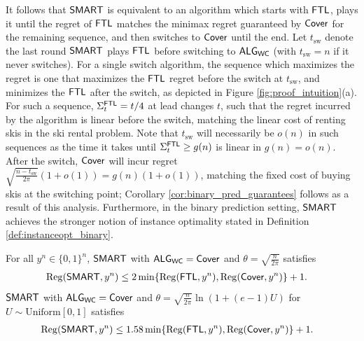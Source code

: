 It follows that $\mathsf{SMART}$ is equivalent to an algorithm which starts with $\mathsf{FTL}$, plays it until the regret of $\mathsf{FTL}$ matches the minimax regret guaranteed by $\mathsf{Cover}$ for the remaining sequence, and then switches to $\mathsf{Cover}$ until the end. 
Let $t_{\mathrm{sw}}$ denote the last round $\mathsf{SMART}$ plays $\mathsf{FTL}$ before switching to $\mathsf{ALG}_{\mathsf{WC}}$ (with $t_{\mathrm{sw}}=n$ if it never switches).
For a single switch algorithm, the sequence which maximizes the regret is one that maximizes the $\mathsf{FTL}$ regret before the switch at $t_{\mathrm{sw}}$, and minimizes the $\mathsf{FTL}$ after the switch, as depicted in Figure \ref{fig:proof_intuition}(a). For such a sequence, $\Sigma^{\mathsf{FTL}}_t = t/4$ at lead changes $t$, such that the regret incurred by the algorithm is linear before the switch, matching the linear cost of renting skis in the ski rental problem. Note that $t_{\mathrm{sw}}$ will necessarily be $o(n)$ in such sequences as the time it takes until $\Sigma^{\mathsf{FTL}}_t \geq g(n)$ is linear in $g(n) = o(n)$. After the switch, $\mathsf{Cover}$ will incur regret $\sqrt{\frac{n-t_{\mathrm{sw}}}{2 \pi}} (1+o(1)) = g(n) (1 + o(1))$, matching the fixed cost of buying skis at the switching point; Corollary \ref{cor:binary_pred_guarantees} follows as a result of this analysis. Furthermore, in the binary prediction setting, $\mathsf{SMART}$ achieves the stronger notion of instance optimality stated in Definition \ref{def:instanceopt_binary}.

\begin{corollary} \label{cor:binary_pred_guarantees}
For all $y^n\in\{0,1\}^n$, $\mathsf{SMART}$ with $\mathsf{ALG}_{\mathsf{WC}}=\mathsf{Cover}$ and $\theta = \sqrt{\frac{n}{2 \pi}}$ satisfies
\begin{align*}
    \mathrm{Reg}(\mathsf{SMART},y^n) &\leq 2\min\{\mathrm{Reg}(\mathsf{FTL},y^n),\mathrm{Reg}(\mathsf{Cover},y^n)\} + 1.
\end{align*}
$\mathsf{SMART}$ with $\mathsf{ALG}_{\mathsf{WC}}=\mathsf{Cover}$ and $\theta = \sqrt{\frac{n}{2\pi}}\ln(1+(e-1)U)$ for $U\sim\text{Uniform}[0,1]$ satisfies
\begin{align*}
    \mathrm{Reg}(\mathsf{SMART},y^n)
    &\leq 1.58\min\{\mathrm{Reg}(\mathsf{FTL},y^n),\mathrm{Reg}(\mathsf{Cover},y^n)\} + 1.
\end{align*}
\end{corollary}

